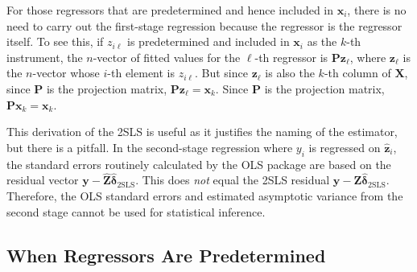 For those regressors that are predetermined and hence included in $\mathbf{x}_i$, there is no
need to carry out the first-stage regression because the regressor is the regressor
itself.  To see this, if $z_{i\ell}$ is predetermined and included in $\mathbf{x}_i$ as the $k$-th instrument,
the $n$-vector of fitted values for the $\ell$-th regressor is $\mathbf{P}\mathbf{z}_\ell$, where $\mathbf{z}_\ell$
is the $n$-vector whose $i$-th element is $z_{i\ell}$.  But since $\mathbf{z}_\ell$ is also the $k$-th column of
$\mathbf{X}$, since $\mathbf{P}$ is the projection matrix, $\mathbf{P}\mathbf{z}_\ell = \mathbf{x}_k$.
Since $\mathbf{P}$ is the projection matrix, $\mathbf{P}\mathbf{x}_k = \mathbf{x}_k$.

This derivation of the 2SLS is useful as it justifies the naming of the estimator,
but there is a pitfall.  In the second-stage regression where $y_i$ is regressed on
$\hat{\mathbf{z}}_i$, the standard errors routinely calculated by the OLS package are based on the
residual vector $\mathbf{y} - \hat{\mathbf{Z}}\hat{\boldsymbol{\delta}}_{\text{2SLS}}$.
This does \emph{not} equal the 2SLS residual
$\mathbf{y} - \mathbf{Z}\hat{\boldsymbol{\delta}}_{\text{2SLS}}$.  Therefore, the OLS standard errors and
estimated asymptotic variance from the second stage cannot be used for statistical
inference.

\subsection*{When Regressors Are Predetermined}

